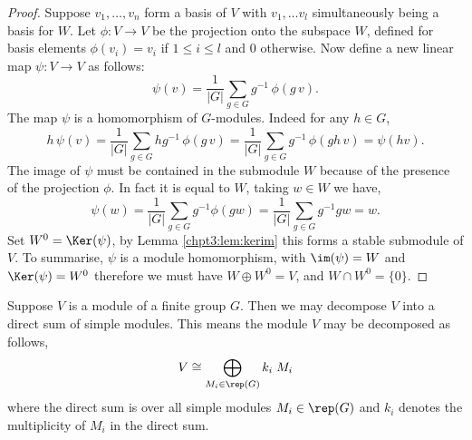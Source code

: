 \documentclass[11pt]{report}
\begin{document}
\begin{proof}
	
	
	
	
	
	
	
	
	Suppose $v_{1},\dots,v_{n}$ form a basis of $V$ with  $v_{1},\ldots v_{l}$ simultaneously being a basis for $W$. Let $\phi:V\to V$ be the projection onto the subspace $W$, defined for basis elements  $\phi(v_{i}) = v_{i}$ if $1\leq i \leq l$ and $0$ otherwise. Now define a new linear map $\psi:V \to V$ as follows:
	\[\psi(v) = \frac{1}{|G|}\sum_{g\in G} g^{-1} \, \phi(g \,v).\]
	The map $\psi$ is a homomorphism of $G$-modules. Indeed for any $h\in G$,
	\[h\,\psi(v) = \frac{1}{|G|}\sum_{g\in G}hg^{-1} \, \phi ( g \,v) = \frac{1}{|G|}\sum_{g\in G}g^{-1} \, \phi ( gh\,v) = \psi(hv).\]
	The image of $\psi$ must be contained in the submodule $W$ because of the presence of the projection $\phi$. In fact it is equal to $W$, taking $w\in W$ we have,
	\[ \psi(w) = \frac{1}{|G|}\sum_{g \in G} g^{-1}\phi( g w)  =\frac{1}{|G|}\sum_{g \in G} g^{-1} g w = w  .\]
	Set $W^{0} = \Ker(\psi)$, by Lemma \ref{chpt3:lem:kerim} this forms a stable submodule of $V$. 
	To summarise, $\psi$ is a module homomorphism, with $\im(\psi) = W$ and $\Ker(\psi)= W^{0}$ therefore we must have $W \oplus W^{0} =V$, and $W \cap W^{0} = \{0\}$.
\end{proof}




















\begin{thm}
	\label{chpt3:thm:decomposition} Suppose $V$ is a 
	module of a finite group $G$. Then we may 
	decompose $V$ into a direct sum of simple modules. This means the module $V$ may be decomposed as follows, 
	\begin{eqnarray}
	\label{chpt3:eqn:decomposition}
	V \cong \bigoplus_{M_{i} \in \rep(G)} k_{i} \; M_{i}
	\end{eqnarray}
	where the direct sum is over all simple modules $
	M_{i} \in \rep(G)$ and $k_{i}$ denotes the multiplicity of $M_{i}$ in the direct sum.
\end{thm}
\end{document}
